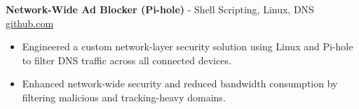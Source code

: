 \documentclass[11pt]{article}       %
\begin{document}
\textbf{Network-Wide Ad Blocker (Pi-hole)}{ - Shell Scripting, Linux, DNS} \hfill \href{https://github.com/Monica20030707}{github.com} \\
\vspace{-9pt}
\begin{itemize}
  \item Engineered a custom network-layer security solution using Linux and Pi-hole to filter DNS traffic across all connected devices.
  \item Enhanced network-wide security and reduced bandwidth consumption by filtering malicious and tracking-heavy domains.
\end{itemize}

\end{document}
